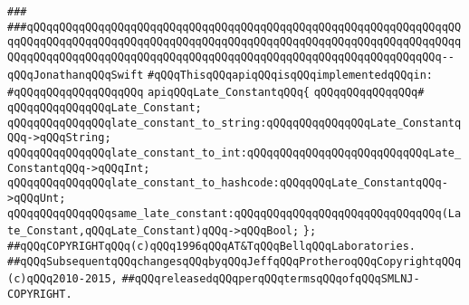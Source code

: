 \verb|###|\newline
\verb|###qQQqqQQqqQQqqQQqqQQqqQQqqQQqqQQqqQQqqQQqqQQqqQQqqQQqqQQqqQQqqQQqqQQqqQQqqQQqqQQqqQQqqQQqqQQqqQQqqQQqqQQqqQQqqQQqqQQqqQQqqQQqqQQqqQQqqQQqqQQqqQQqqQQqqQQqqQQqqQQqqQQqqQQqqQQqqQQqqQQqqQQqqQQqqQQqqQQqqQQqqQQq--qQQqJonathanqQQqSwift|\newline
\newline
\verb|#qQQqThisqQQqapiqQQqisqQQqimplementedqQQqin:|\newline
\verb|#qQQqqQQqqQQqqQQqqQQq|\newline
\newline
\verb|apiqQQqLate_ConstantqQQq{|\newline
\verb|qQQqqQQqqQQqqQQq#|\newline
\verb|qQQqqQQqqQQqqQQqLate_Constant;|\newline
\newline
\verb|qQQqqQQqqQQqqQQqlate_constant_to_string:qQQqqQQqqQQqqQQqLate_ConstantqQQq->qQQqString;|\newline
\verb|qQQqqQQqqQQqqQQqlate_constant_to_int:qQQqqQQqqQQqqQQqqQQqqQQqqQQqLate_ConstantqQQq->qQQqInt;|\newline
\verb|qQQqqQQqqQQqqQQqlate_constant_to_hashcode:qQQqqQQqLate_ConstantqQQq->qQQqUnt;|\newline
\verb|qQQqqQQqqQQqqQQqsame_late_constant:qQQqqQQqqQQqqQQqqQQqqQQqqQQqqQQq(Late_Constant,qQQqLate_Constant)qQQq->qQQqBool;|\newline
\verb|};|\newline
\newline
\newline
\verb|##qQQqCOPYRIGHTqQQq(c)qQQq1996qQQqAT&TqQQqBellqQQqLaboratories.|\newline
\verb|##qQQqSubsequentqQQqchangesqQQqbyqQQqJeffqQQqProtheroqQQqCopyrightqQQq(c)qQQq2010-2015,|\newline
\verb|##qQQqreleasedqQQqperqQQqtermsqQQqofqQQqSMLNJ-COPYRIGHT.|\newline

